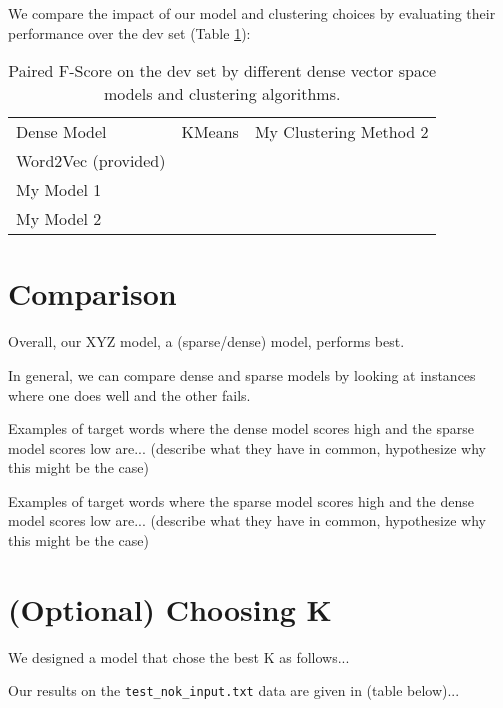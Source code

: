 \documentclass[12pt]{article}
\begin{document}
We compare the impact of our model and clustering choices by evaluating their performance over the dev set (Table \ref{tab:denseresults}):

\begin{table}[]
\centering
\begin{tabular}{lll}
Dense Model  & KMeans & My Clustering Method 2 \\
Word2Vec (provided) &        &                        \\
My Model 1          &        &                        \\
My Model 2          &        &                       
\end{tabular}
\caption{Paired F-Score on the dev set by different dense vector space models and clustering algorithms.}
\label{tab:denseresults}
\end{table}

\section{Comparison}

Overall, our XYZ model, a (sparse/dense) model, performs best. 

In general, we can compare dense and sparse models by looking at instances where one does well and the other fails.

Examples of target words where the dense model scores high and the sparse model scores low are... (describe what they have in common, hypothesize why this might be the case)

Examples of target words where the sparse model scores high and the dense model scores low are... (describe what they have in common, hypothesize why this might be the case)



\section{(Optional) Choosing K}

We designed a model that chose the best K as follows...

Our results on the \texttt{test_nok_input.txt} data are given in (table below)...
\end{document}
